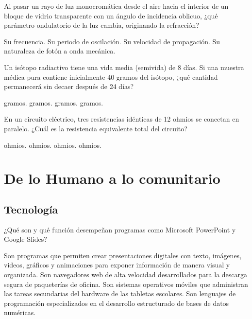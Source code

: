 \documentclass[12pt]{evaluasep}
\begin{document}
\begin{questions}
        \newpage

    \question Al pasar un rayo de luz monocromática desde el aire hacia el interior de un bloque de vidrio transparente con un ángulo de incidencia oblicuo, ¿qué parámetro ondulatorio de la luz cambia, originando la refracción?
    \begin{choices}
        \choice Su frecuencia.
        \choice Su periodo de oscilación.
        \CorrectChoice Su velocidad de propagación.
        \choice Su naturaleza de fotón a onda mecánica.
    \end{choices}

    \question Un isótopo radiactivo tiene una vida media (semivida) de 8 días. Si una muestra médica pura contiene inicialmente 40 gramos del isótopo, ¿qué cantidad permanecerá sin decaer después de 24 días?
    \begin{choices}
         gramos.
         gramos. 
         gramos.
         gramos.
    \end{choices}

    \question En un circuito eléctrico, tres resistencias idénticas de 12 ohmios se conectan en paralelo. ¿Cuál es la resistencia equivalente total del circuito?
    \begin{choices}
         ohmios.
         ohmios.
         ohmios.
         ohmios. 
    \end{choices}

\section{De lo Humano a lo comunitario}
\subsection{Tecnología}

\question ¿Qué son y qué función desempeñan programas como Microsoft PowerPoint y Google Slides?
    \begin{choices}
        \CorrectChoice Son programas que permiten crear presentaciones digitales con texto, imágenes, videos, gráficos y animaciones para exponer información de manera visual y organizada.
        \choice Son navegadores web de alta velocidad desarrollados para la descarga segura de paqueterías de oficina.
        \choice Son sistemas operativos móviles que administran las tareas secundarias del hardware de las tabletas escolares.
        \choice Son lenguajes de programación especializados en el desarrollo estructurado de bases de datos numéricas.
    \end{choices}


\end{questions}
\end{document}
